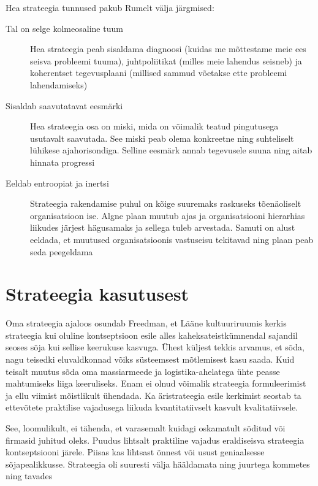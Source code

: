 Hea strateegia tunnused pakub Rumelt välja järgmised:
\begin{description}
	\item[Tal on selge kolmeosaline tuum] Hea strateegia peab sisaldama diagnoosi (kuidas me mõttestame meie ees seisva probleemi tuuma), juhtpoliitikat (milles meie lahendus seisneb) ja koherentset tegevusplaani (millised sammud võetakse ette probleemi lahendamiseks)
	\item[Sisaldab saavutatavat eesmärki] Hea strateegia osa on miski, mida on võimalik teatud pingutusega usutavalt saavutada. See miski peab olema konkreetne ning suhteliselt lühikese ajahorisondiga. Selline eesmärk annab tegevusele suuna ning aitab hinnata progressi
	\item[Eeldab entroopiat ja inertsi] Strateegia rakendamise puhul on kõige suuremaks raskuseks tõenäoliselt organisatsioon ise. Algne plaan muutub ajas ja organisatsiooni hierarhias liikudes järjest hägusamaks ja sellega tuleb arvestada. Samuti on alust eeldada, et muutused organisatsioonis vastuseisu tekitavad ning plaan peab seda peegeldama
\end{description}

\section{Strateegia kasutusest}
\label{sec:strateegia:kasutu}
Oma strateegia ajaloos osundab Freedman, et Lääne kultuuriruumis kerkis strateegia kui oluline kontseptsioon esile alles kaheksateistkümnendal sajandil seoses sõja kui sellise keerukuse kasvuga\cite{freedman2013strategy}. Ühest küljest tekkis arvamus, et sõda, nagu teisedki eluvaldkonnad võiks süsteemsest mõtlemisest kasu saada. Kuid teisalt muutus sõda oma massiarmeede ja logistika-ahelatega ühte peasse mahtumiseks liiga keeruliseks. Enam ei olnud võimalik strateegia formuleerimist ja ellu viimist mõistlikult ühendada. Ka äristrateegia esile kerkimist seostab ta ettevõtete praktilise vajadusega liikuda kvantitatiivselt kasvult kvalitatiivsele.

See, loomulikult, ei tähenda, et varasemalt kuidagi oskamatult sõditud või firmasid juhitud oleks. Puudus lihtsalt praktiline vajadus eraldiseisva strateegia kontseptsiooni järele. Piisas kas lihtsast õnnest või usust geniaalsesse sõjapealikkusse. Strateegia oli suuresti välja hääldamata ning juurtega kommetes ning tavades

